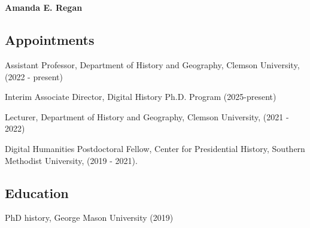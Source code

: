 \documentclass[11pt]{article}
\begin{document}
\thispagestyle{fancy}
\fancyfoot{}
\fancyhead{}
\renewcommand{\headrulewidth}{0pt}


\hfill\hfill\hfill
\hfill\hfill\hfill
\hfill\hfill\hfill
\hfill\hfill\hfill
\begin{minipage}[t]{1.6in}
   \\
   \\
\end{minipage}
\hfill
\begin{minipage}[t]{1.9in}
\end{minipage}


\vspace{0.1in}

{\Large\bfseries Amanda E. Regan}

\subsection{Appointments}\label{current-position}

Assistant Professor, Department of History and Geography, Clemson University, (2022 - present)
      
  \qquad Interim Associate Director, Digital History Ph.D. Program (2025-present)

Lecturer, Department of History and Geography, Clemson University, (2021 - 2022)

Digital Humanities Postdoctoral Fellow, Center for Presidential History, Southern Methodist University, (2019 - 2021).

\subsection{Education}\label{education}
PhD history, George Mason University (2019)
\end{document}
